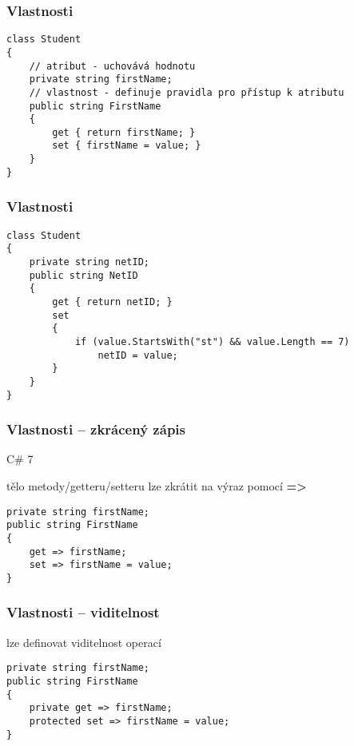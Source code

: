 

\begin{frame}[fragile]
\frametitle{Vlastnosti}
\begin{yesblock}
\begin{lstlisting}
class Student
{
    // atribut - uchovává hodnotu
    private string firstName; 
    // vlastnost - definuje pravidla pro přístup k atributu
    public string FirstName 
    {
        get { return firstName; }
        set { firstName = value; }
    }
}
\end{lstlisting}
\end{yesblock}
\end{frame}



\begin{frame}[fragile]
\frametitle{Vlastnosti}
\begin{yesblock}
\begin{lstlisting}
class Student
{
    private string netID;
    public string NetID
    {
        get { return netID; }
        set
        {
            if (value.StartsWith("st") && value.Length == 7)
                netID = value;
        }
    }
}
\end{lstlisting}
\end{yesblock}
\end{frame}


\begin{frame}[fragile]
\frametitle{Vlastnosti -- zkrácený zápis}
\begin{bitemize}{C\# 7}
\item tělo metody/getteru/setteru lze zkrátit na výraz pomocí \textbf{=>}
\end{bitemize}

\begin{yesblock}
\begin{lstlisting}
private string firstName;
public string FirstName
{
    get => firstName;
    set => firstName = value;
}
\end{lstlisting}
\end{yesblock}
\end{frame}


\begin{frame}[fragile]
\frametitle{Vlastnosti -- viditelnost}
\begin{bitemize}{}
\item lze definovat viditelnost operací
\end{bitemize}

\begin{yesblock}
\begin{lstlisting}
private string firstName;
public string FirstName
{
    private get => firstName;
    protected set => firstName = value;
}
\end{lstlisting}
\end{yesblock}
\end{frame}


